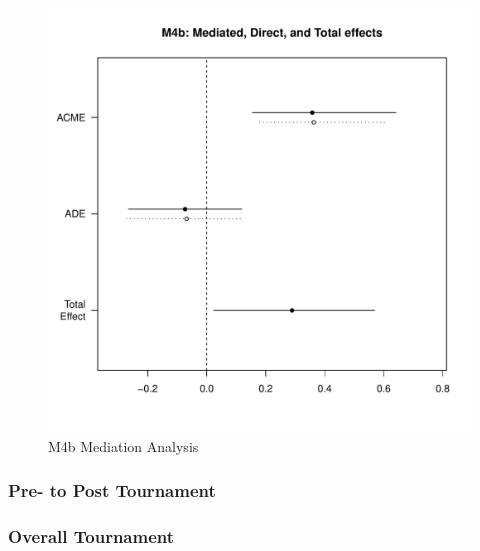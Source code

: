                \begin{figure}[htbp]
                 \centering
                 \includegraphics[scale = .5]{images/MLM4bMediationEffects.pdf}
                 \caption{M4b Mediation Analysis}
                 \label{fig:MLM4bMediationAnalysis}
               \end{figure}



            \subsubsection{Pre- to Post Tournament}

            \subsubsection{Overall Tournament}


                    














